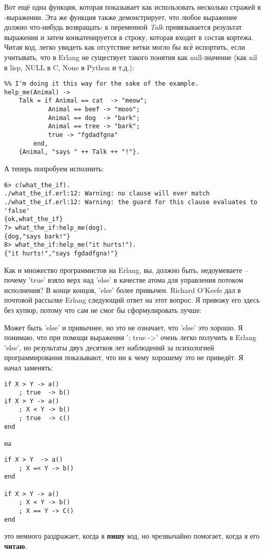 Вот ещё одна функция, которая показывает как использовать несколько стражей в \--выражении.
Эта же функция также демонстрирует, что любое выражение должно что\--нибудь возвращать: к переменной \emph{Talk} привязывается результат выражения  и затем конкатенируется в строку, которая входит в состав кортежа.
Читая код, легко увидеть как отсутствие ветки  могло бы всё испортить, если учитывать, что в Erlang не существует такого понятия как null\--значение (как nil в lisp, NULL в C, None в Python и т.д.):
\begin{lstlisting}[style=erlang]
%% note, this one would be better as a pattern match in function heads!
%% I'm doing it this way for the sake of the example.
help_me(Animal) ->
    Talk = if Animal == cat  -> "meow";
            Animal == beef -> "mooo";
            Animal == dog  -> "bark";
            Animal == tree -> "bark";
            true -> "fgdadfgna"
        end,
    {Animal, "says " ++ Talk ++ "!"}.
\end{lstlisting}
А теперь попробуем исполнить:
\begin{lstlisting}[style=erlang]
6> c(what_the_if).
./what_the_if.erl:12: Warning: no clause will ever match
./what_the_if.erl:12: Warning: the guard for this clause evaluates to 'false'
{ok,what_the_if}
7> what_the_if:help_me(dog).
{dog,"says bark!"}
8> what_the_if:help_me("it hurts!").
{"it hurts!","says fgdadfgna!"}
\end{lstlisting}
Как и множество программистов на Erlang, вы, должно быть, недоумеваете \--- почему 'true' взяло верх над 'else' в качестве атома для управления потоком исполнения?
В конце концов, 'else' более привычен.
Richard O'Keefe дал в почтовой рассылке Erlang следующий ответ на этот вопрос.
Я привожу его здесь без купюр, потому что сам не смог бы сформулировать лучше:\\
\colorbox{lgray}
{
    \begin{minipage}{\linewidth}
    Может быть 'else' и привычнее, но это не означает, что 'else' это хорошо.
    Я понимаю, что при помощи выражения '; true ->' очень легко получить в Erlang 'else', но результаты двух десятков лет наблюдений за психологией программирования показывают, что ни к чему хорошему это не приведёт.
    Я начал заменять:
\end{minipage}
}
\begin{lstlisting}[style=erlang]
if X > Y -> a()
    ; true  -> b()
if X > Y -> a()
    ; X < Y -> b()
    ; true  -> c()
end
\end{lstlisting}
\colorbox{lgray}
{
    \begin{minipage}{\linewidth}
на
    \end{minipage}
}
\begin{lstlisting}[style=erlang]     
if X > Y  -> a()
    ; X =< Y -> b()
end

if X > Y -> a()
    ; X < Y -> b()
    ; X == Y -> C()
end
\end{lstlisting}
\colorbox{lgray}
{
    \begin{minipage}{\linewidth}
это немного раздражает, когда я \textbf{пишу} код, но чрезвычайно помогает, когда я его \textbf{читаю}.
    \end{minipage}
}


